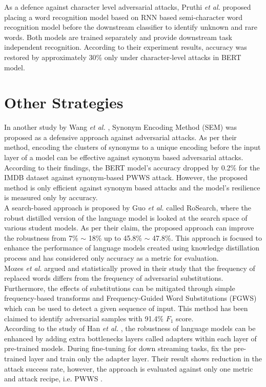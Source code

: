 \documentclass[%
	BCOR=8mm, %
	DIV=12,
	toc=bibliography, %
	toc=listof, %
	oneside, %
	egregdoesnotlikesansseriftitles, %
	]{scrbook}
\begin{document}
As a defence against character level adversarial attacks, Pruthi \textit{et al.} \cite{pruthi_combating_2019} proposed placing a word recognition model based on RNN based semi-character word recognition model before the downstream classifier to identify unknown and rare words. Both models are trained separately and provide downstream task independent recognition. According to their experiment results, accuracy was restored by approximately 30\% only under character-level attacks in BERT model. 
\section{Other Strategies}
In another study by Wang \textit{et al.} \cite{wang_natural_2020-1}, Synonym Encoding Method (SEM) was proposed as a defensive approach against adversarial attacks. As per their method,  encoding the clusters of synonyms to a unique encoding before the input layer of a model can be effective against synonym based adversarial attacks. According to their findings, the BERT model's accuracy dropped by 0.2\% for the IMDB dataset against synonym-based PWWS \cite{ren_generating_2019} attack. However, the proposed method is only efficient against synonym based attacks and the model's resilience is measured only by accuracy.\\
A search-based approach is proposed by Guo \textit{et al.} \cite{guo_rosearch_2021} called RoSearch, where the robust distilled version of the language model is looked at the search space of various student models. As per their claim, the proposed approach can improve the robustness from 7\% $\sim$ 18\% up to 45.8\% $\sim$ 47.8\%. This approach is focused to enhance the performance of language models created using knowledge distillation process and has considered only accuracy as a metric for evaluation.\\
Mozes \textit{et al.} \cite{mozes_frequency-guided_2021} argued and statistically proved in their study that the frequency of replaced words differs from the frequency of adversarial substitutions. Furthermore, the effects of substitutions can be mitigated through simple frequency-based transforms and Frequency-Guided Word Substitutions (FGWS) which can be used to detect a given sequence of input. This method has been claimed to identify adversarial samples with 91.4\% $F_{1}$ score.\\
According to the study of Han \textit{et al.} \cite{han_robust_2021}, the robustness of language models can be enhanced by adding extra bottlenecks layers called adapters within each layer of pre-trained models. During fine-tuning for down streaming tasks, fix the pre-trained layer and train only the adapter layer. Their result shows reduction in the attack success rate, however,  the approach is evaluated against only one metric and attack recipe, i.e. PWWS \cite{ren_generating_2019}.\\
\end{document}
